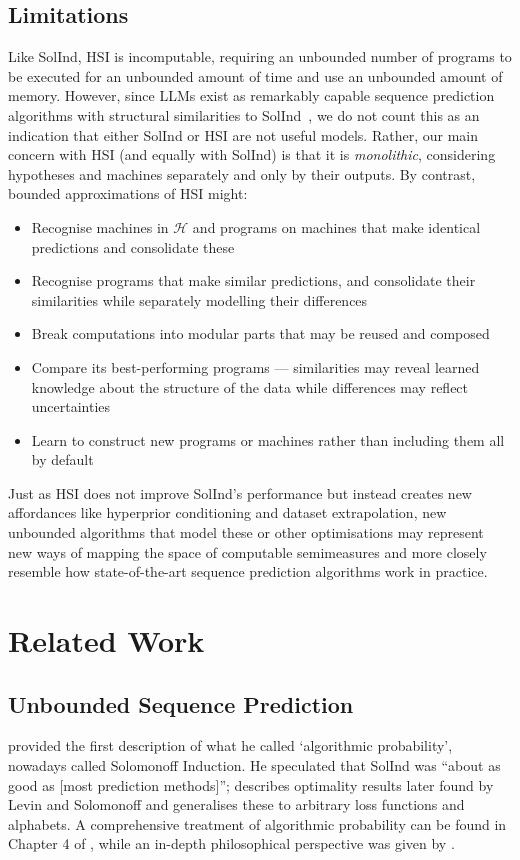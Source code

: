 \documentclass[11pt]{article}
\newcommand{\Eta}{\mathcal{H}}
\begin{document}
\subsection{Limitations}
Like SolInd, HSI is incomputable, requiring an unbounded number of programs to be executed for an unbounded amount of time and use an unbounded amount of memory.
However, since LLMs exist as remarkably capable sequence prediction algorithms with structural similarities to SolInd~\citep{Young2025}, we do not count this as an indication that either SolInd or HSI are not useful models.
Rather, our main concern with HSI (and equally with SolInd) is that it is \textit{monolithic}, considering hypotheses and machines separately and only by their outputs.
By contrast, bounded approximations of HSI might:
\begin{itemize}
    \item Recognise machines in $\Eta$ and programs on machines that make identical predictions and consolidate these
    \item Recognise programs that make similar predictions, and consolidate their similarities while separately modelling their differences
    \item Break computations into modular parts that may be reused and composed
    \item Compare its best-performing programs --- similarities may reveal learned knowledge about the structure of the data while differences may reflect uncertainties
    \item Learn to construct new programs or machines rather than including them all by default
\end{itemize}
Just as HSI does not improve SolInd's performance but instead creates new affordances like hyperprior conditioning and dataset extrapolation, new unbounded algorithms that model these or other optimisations may represent new ways of mapping the space of computable semimeasures and more closely resemble how state-of-the-art sequence prediction algorithms work in practice.


\section{Related Work}

\subsection{Unbounded Sequence Prediction}
\citet{Solomonoff1964} provided the first description of what he called `algorithmic probability', nowadays called Solomonoff Induction. He speculated that SolInd was ``about as good as [most prediction methods]''; \citet{Hutter2001} describes optimality results later found by Levin and Solomonoff and generalises these to arbitrary loss functions and alphabets.
A comprehensive treatment of algorithmic probability can be found in Chapter 4 of \citet{LiVitanyi2019}, while an in-depth philosophical perspective was given by \citet{Rathmanner2011}.
\end{document}
